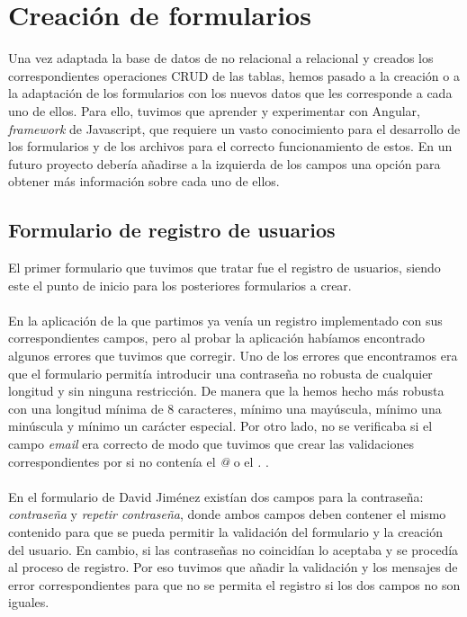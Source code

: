 \documentclass[11pt]{book}
\begin{document}
\chapter{Creación de formularios}\label{cap:formularios}
Una vez adaptada la base de datos de no relacional a relacional y creados los correspondientes operaciones CRUD de las tablas, hemos pasado a la creación o a la adaptación de los formularios con los nuevos datos que les corresponde a cada uno de ellos. Para ello, tuvimos que aprender y experimentar con Angular, \emph{framework} de Javascript, que requiere un vasto conocimiento para el desarrollo de los formularios y de los archivos para el correcto funcionamiento de estos. En un futuro proyecto debería añadirse a la izquierda de los campos una opción para obtener más información sobre cada uno de ellos.
\section{Formulario de registro de usuarios}
El primer formulario que tuvimos que tratar fue el registro de usuarios, siendo este el punto de inicio para los posteriores formularios a crear.\\\\
En la aplicación de la que partimos ya venía un registro implementado con sus correspondientes campos, pero al probar la aplicación habíamos encontrado algunos errores que tuvimos que corregir. Uno de los errores que encontramos era que el formulario permitía introducir una contraseña no robusta de cualquier longitud y sin ninguna restricción. De manera que la hemos hecho más robusta con una longitud mínima de 8 caracteres, mínimo una mayúscula, mínimo una minúscula y mínimo un carácter especial. Por otro lado, no se verificaba si el campo \emph{email} era correcto de modo que tuvimos que crear las validaciones correspondientes por si no contenía el \emph{@} o el \emph{.} .\\\\
En el formulario de David Jiménez existían dos campos para la contraseña: \emph{contraseña} y   \emph{repetir contraseña}, donde ambos campos deben contener el mismo contenido para que se pueda permitir la validación del formulario y la creación del usuario. En cambio, si las contraseñas no coincidían lo aceptaba y se procedía al proceso de registro. Por eso tuvimos que añadir la validación y los mensajes de error correspondientes para que no se permita el registro si los dos campos no son iguales.\\\\
\end{document}
